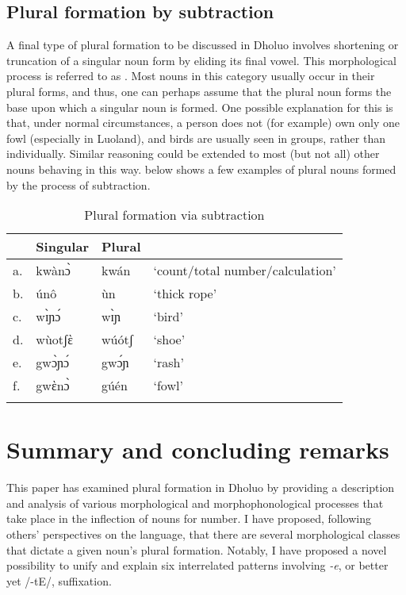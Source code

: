 \documentclass[output=paper,colorlinks,citecolor=brown]{langscibook}
\begin{document}
\subsection{Plural formation by subtraction}

A final type of plural formation to be discussed in Dholuo involves shortening or truncation of a singular noun form by eliding its final vowel. This morphological process is referred to as . Most nouns in this category usually occur in their plural forms, and thus, one can perhaps assume that the plural noun forms the base upon which a singular noun is formed. One possible explanation for this is that, under normal circumstances, a person does not (for example) own only one fowl (especially in Luoland), and birds are usually seen in groups, rather than individually. Similar reasoning could be extended to most (but not all) other nouns behaving in this way.  below shows a few examples of plural nouns formed by the process of subtraction. 

\begin{table}
\caption{Plural formation via subtraction}
\label{tab:Subtraction}
 \begin{tabular}{llll}
  \lsptoprule
& Singular & Plural &  \\
\midrule
a.	&kwànɔ̀&	kwán&	`count/total number/calculation' \\
b.&	únô	&ùn&	`thick rope' \\
c.	&wɪ̀ɲɔ́	&wɪ̀ɲ&	`bird' \\
d.&	wùotʃὲ	&wúótʃ	&`shoe' \\
e.	&gwɔ̀ɲɔ́	&gwɔ́ɲ&	`rash' \\
f.&	gwὲnɔ̀&	gúén&	`fowl' \\
  \lspbottomrule
 \end{tabular}
\end{table}  

\section{Summary and concluding remarks} \label{04_Section5}

This paper has examined plural formation in Dholuo by providing a description and analysis of various morphological and morphophonological processes that take place in the inflection of nouns for number. I have proposed, following others' perspectives on the language, that there are several morphological classes that dictate a given noun's plural formation. Notably, I have proposed a novel possibility to unify and explain six interrelated patterns involving \textit{-e}, or better yet /-tE/, suffixation. 
\end{document}
